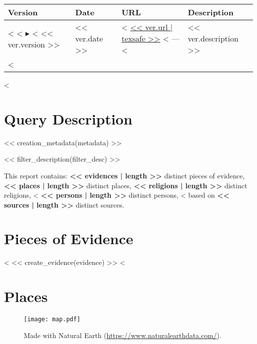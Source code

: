 \documentclass[fontsize=10pt,toc=chapterentrywithdots]{scrreprt}
\begin{document}
\begin{center}
\renewcommand{\arraystretch}{1.3}
\footnotesize
\begin{longtable}{@{}p{1cm}p{1.5cm}p{6cm}p{5.8cm}@{}}
  \textbf{Version} & \textbf{Date} & \textbf{URL} & \textbf{Description} \\
  \hline
  \endhead
    <%
      <%
      $\blacktriangleright$
      <%
      \hfill << ver.version >>
      &
      << ver.date >>
      &
      <%
      \scriptsize{\url{<< ver.url | texsafe >>}}
      <%
      ---
      <%
      &
      << ver.description >>
      \\
    <%
\end{longtable}
\end{center}
<%

\chapter{Query Description}
\label{sec:filters}

<< creation_metadata(metadata) >>

<< filter_description(filter_desc) >>

This report contains:
\textbf{<< evidences | length >>} distinct pieces of evidence,
\textbf{<< places | length >>} distinct places,
\textbf{<< religions | length >>} distinct religions,
<%
\textbf{<< persons | length >>} distinct persons,
<%
based on \textbf{<< sources | length >>} distinct sources.


\clearpage
\chapter{Pieces of Evidence}
\label{sec:evidences}

<%
  << create_evidence(evidence) >>
<%


\clearpage
\chapter{Places}
\label{sec:places}

\begin{figure}[H]
  \texttt{[image: map.pdf]}
  \caption{Made with Natural Earth (\url{https://www.naturalearthdata.com/}).}
\end{figure}
\end{document}
